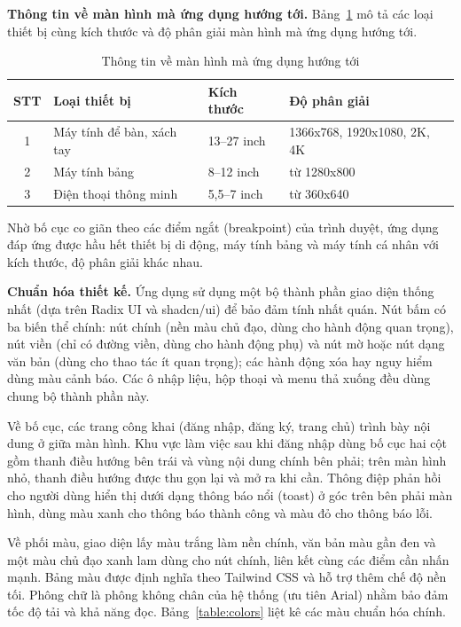 \documentclass[../DoAn.tex]{subfiles}
\begin{document}
\textbf{Thông tin về màn hình mà ứng dụng hướng tới.} Bảng~\ref{table:devices} mô tả các loại thiết bị cùng kích thước và độ phân giải màn hình mà ứng dụng hướng tới.

\begin{table}[H]
\centering
\begin{tabular}{|c|l|l|l|}
\hline
\textbf{STT} & \textbf{Loại thiết bị} & \textbf{Kích thước} & \textbf{Độ phân giải} \\ \hline
1 & Máy tính để bàn, xách tay & 13--27 inch & 1366x768, 1920x1080, 2K, 4K \\ \hline
2 & Máy tính bảng & 8--12 inch & từ 1280x800 \\ \hline
3 & Điện thoại thông minh & 5,5--7 inch & từ 360x640 \\ \hline
\end{tabular}
\caption{Thông tin về màn hình mà ứng dụng hướng tới}
\label{table:devices}
\end{table}

Nhờ bố cục co giãn theo các điểm ngắt (breakpoint) của trình duyệt, ứng dụng đáp ứng được hầu hết thiết bị di động, máy tính bảng và máy tính cá nhân với kích thước, độ phân giải khác nhau.

\textbf{Chuẩn hóa thiết kế.} Ứng dụng sử dụng một bộ thành phần giao diện thống nhất (dựa trên Radix UI và shadcn/ui) để bảo đảm tính nhất quán. Nút bấm có ba biến thể chính: nút chính (nền màu chủ đạo, dùng cho hành động quan trọng), nút viền (chỉ có đường viền, dùng cho hành động phụ) và nút mờ hoặc nút dạng văn bản (dùng cho thao tác ít quan trọng); các hành động xóa hay nguy hiểm dùng màu cảnh báo. Các ô nhập liệu, hộp thoại và menu thả xuống đều dùng chung bộ thành phần này.

Về bố cục, các trang công khai (đăng nhập, đăng ký, trang chủ) trình bày nội dung ở giữa màn hình. Khu vực làm việc sau khi đăng nhập dùng bố cục hai cột gồm thanh điều hướng bên trái và vùng nội dung chính bên phải; trên màn hình nhỏ, thanh điều hướng được thu gọn lại và mở ra khi cần. Thông điệp phản hồi cho người dùng hiển thị dưới dạng thông báo nổi (toast) ở góc trên bên phải màn hình, dùng màu xanh cho thông báo thành công và màu đỏ cho thông báo lỗi.

Về phối màu, giao diện lấy màu trắng làm nền chính, văn bản màu gần đen và một màu chủ đạo xanh lam dùng cho nút chính, liên kết cùng các điểm cần nhấn mạnh. Bảng màu được định nghĩa theo Tailwind CSS và hỗ trợ thêm chế độ nền tối. Phông chữ là phông không chân của hệ thống (ưu tiên Arial) nhằm bảo đảm tốc độ tải và khả năng đọc. Bảng~\ref{table:colors} liệt kê các màu chuẩn hóa chính.
\end{document}
